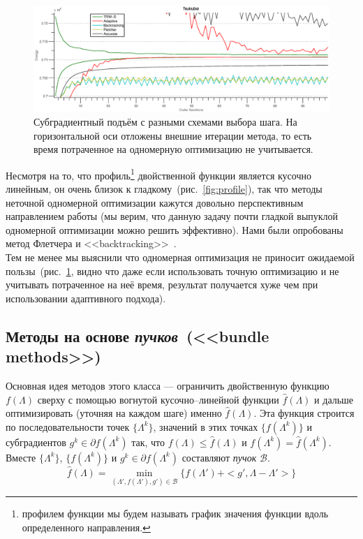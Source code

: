 \documentclass{article}
\begin{document}
\begin{figure}
    \centering
    \includegraphics[width=\textwidth]{subgradient_tsukuba}
    \caption{Субградиентный подъём с разными схемами выбора шага. На горизонтальной оси отложены внешние итерации метода, то есть время потраченное на одномерную оптимизацию не учитывается.}
    \label{fig:1d_optimization}
\end{figure}
Несмотря на то, что профиль\footnote{профилем функции мы будем называть график значения функции вдоль определенного направления.} двойственной функции является кусочно линейным, он очень близок к гладкому~(рис.~\ref{fig:profile}), так что методы неточной одномерной оптимизации кажутся довольно перспективным направлением работы (мы верим, что данную задачу почти гладкой выпуклой одномерной оптимизации можно решить эффективно). Нами были опробованы метод Флетчера и <<backtracking>>~\cite{1d_optimization}.\\
Тем не менее мы выяснили что одномерная оптимизация не приносит ожидаемой пользы~(рис.~\ref{fig:1d_optimization}, видно что даже если использовать точную оптимизацию и не учитывать потраченное на неё время, результат получается хуже чем при использовании адаптивного подхода).


\subsection{Методы на основе \textit{пучков}~(<<bundle methods>>)}
Основная идея методов этого класса --- ограничить двойственную функцию $f(\Lambda)$ сверху с помощью вогнутой кусочно--линейной функции $\hat{f}(\Lambda)$ и дальше оптимизировать (уточняя на каждом шаге) именно $\hat{f}(\Lambda)$. Эта функция строится по последовательности точек $\{\Lambda^k\}$, значений в этих точках $\{f(\Lambda^k)\}$ и субградиентов $g^k \in \partial f(\Lambda^k)$ так, что $f(\Lambda) \leq \hat{f}(\Lambda)$ и $f(\Lambda^k) = \hat{f}(\Lambda^k)$. Вместе $\{\Lambda^k\}$, $\{f(\Lambda^k)\}$ и  $g^k \in \partial f(\Lambda^k)$ составляют \textit{пучок} $\mathcal{B}$.
\begin{equation}
\hat{f}(\Lambda) = \min_{(\Lambda{}', f(\Lambda{}'), g{}') \in \mathcal{B}} \{f(\Lambda{}') + <g{}', \Lambda - \Lambda{}'>\}
\end{equation}
\end{document}
